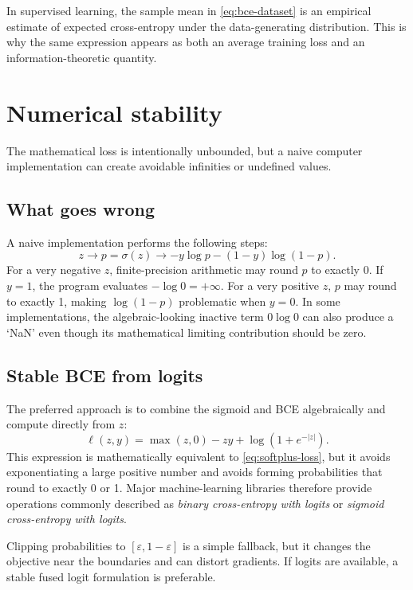 \documentclass[11pt]{article}
\newcommand{\sigmoid}{\sigma}
\theoremstyle{definition}
\begin{document}
In supervised learning, the sample mean in \cref{eq:bce-dataset} is an empirical estimate of expected cross-entropy under the data-generating distribution. This is why the same expression appears as both an average training loss and an information-theoretic quantity.

\section{Numerical stability}

The mathematical loss is intentionally unbounded, but a naive computer implementation can create avoidable infinities or undefined values.

\subsection{What goes wrong}

A naive implementation performs the following steps:
\[
z\longrightarrow p=\sigmoid(z)
\longrightarrow -y\log p-(1-y)\log(1-p).
\]
For a very negative $z$, finite-precision arithmetic may round $p$ to exactly 0. If $y=1$, the program evaluates $-\log 0=+\infty$. For a very positive $z$, $p$ may round to exactly 1, making $\log(1-p)$ problematic when $y=0$. In some implementations, the algebraic-looking inactive term $0\log0$ can also produce a `NaN' even though its mathematical limiting contribution should be zero.

\subsection{Stable BCE from logits}

The preferred approach is to combine the sigmoid and BCE algebraically and compute directly from $z$:
\begin{equation}
\boxed{
\ell(z,y)=\max(z,0)-zy+\log\left(1+e^{-|z|}\right).}
\label{eq:stable-bce}
\end{equation}
This expression is mathematically equivalent to \cref{eq:softplus-loss}, but it avoids exponentiating a large positive number and avoids forming probabilities that round to exactly 0 or 1. Major machine-learning libraries therefore provide operations commonly described as \emph{binary cross-entropy with logits} or \emph{sigmoid cross-entropy with logits}.

Clipping probabilities to $[\varepsilon,1-\varepsilon]$ is a simple fallback, but it changes the objective near the boundaries and can distort gradients. If logits are available, a stable fused logit formulation is preferable.
\end{document}
